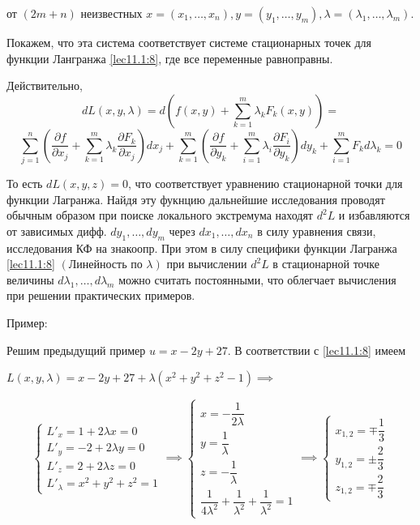 \documentclass[../../main.tex]{subfiles}
\begin{document}
	от $ \left( 2m + n \right) $ неизвестных $x = \left( x_1, \ldots, x_n \right),
	y = \left( y_1, \ldots, y_m \right), \lambda = \left( \lambda_1,
	\ldots, \lambda_m \right) $.
	
	Покажем, что эта система соответствует системе стационарных точек для
	функции Лангранжа \eqref{lec11.1:8}, где все переменные равноправны.
	
	Действительно, 
	\[dL\left( x, y, \lambda \right) = d\left( f\left( x, y\right) 
	+ \sum\limits_{k=1}^{m}\lambda_k F_k\left( x, y \right) \right) =\]
	\[
	\sum\limits_{j=1}^{n}\left( \dfrac{\partial f}{\partial x_j} 
	+ \sum\limits_{k=1}^{m}\lambda_k \dfrac{\partial F_k}{\partial x_j}  
	\right)d x_j + \sum\limits_{k=1}^{m} \left( \dfrac{\partial f}{\partial y_k} 
	+ \sum\limits_{i=1}^{m}\lambda_i \dfrac{\partial F_i}{\partial y_k}  \right)
	d 	y_k + \sum\limits_{i=1}^{m} F_k d \lambda_k = 0\]
	
	То есть $dL\left( x, y, z \right) = 0$, что соответствует уравнению 
	стационарной точки для функции Лагранжа. Найдя эту фукнцию дальнейшие
	исследования проводят обычным образом при поиске локального экстремума 
	находят $d^2L$ и избавляются от зависимых дифф. $d y_1, \ldots, d y_m $ 
	через $d x_1, \ldots, d x_n$ в силу уравнения связи, исследования КФ на 
	знакоопр. При этом в силу специфики функции Лагранжа \eqref{lec11.1:8} 
	$\left( \text{Линейность по } \lambda \right) $ при вычислении $d^2 L$
	в стационарной точке величины $d \lambda_1, \ldots, d \lambda_m$ можно
	считать постоянными, что облегчает вычисления при решении практических
	примеров.
	
	\begin{exmp}
		Пример:
	\end{exmp}
	
	Решим предыдущий пример $u = x - 2y + 27$. В 
	соответствии с \eqref{lec11.1:8} имеем 
	
	$L \left( x, y, \lambda \right) = x - 2y + 27 + \lambda \left( x^2 + y^2 
	+ z^2 - 1 \right) \implies$ 
	
	\[
	\begin{cases}
	L'_x = 1 + 2 \lambda x = 0 \\
	L'_y = -2 + 2 \lambda y = 0 \\
	L'_z = 2 + 2 \lambda z = 0 \\
	L'_\lambda = x^2 + y^2 + z^2 = 1
	\end{cases} \implies
	\begin{cases}
	x = -\dfrac{1}{2\lambda} \\
	y = \dfrac{1}{\lambda} \\
	z = -\dfrac{1}{\lambda} \\
	\dfrac{1}{4\lambda^2} + \dfrac{1}{\lambda^2} + \dfrac{1}{\lambda^2} = 1
	\end{cases} \implies
	\begin{cases}
	x_{1, 2} = \mp \dfrac{1}{3} \\
	y_{1, 2} = \pm \dfrac{2}{3} \\
	z_{1, 2} = \mp \dfrac{2}{3} 
	\end{cases}
	\]
	
\end{document}

